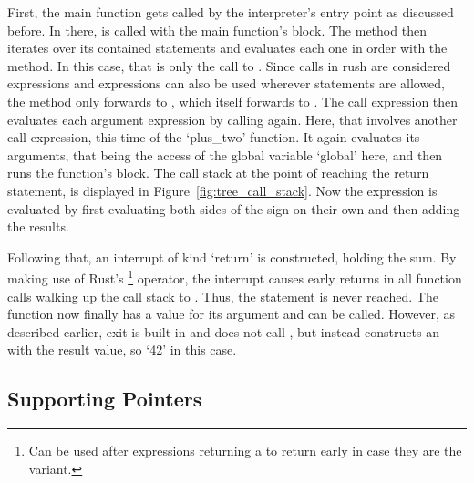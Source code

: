 First, the main function gets called by the interpreter's entry point as discussed before.
In there,  is called with the main function's block.
The  method then iterates over its contained statements and evaluates each one in order with the  method.
In this case, that is only the call to .
Since calls in rush are considered expressions and expressions can also be used wherever statements are allowed, the  method only forwards to , which itself forwards to .
The call expression then evaluates each argument expression by calling  again.
Here, that involves another call expression, this time of the `plus\_two' function.
It again evaluates its arguments, that being the access of the global variable `global' here, and then runs the function's block.
The call stack at the point of reaching the return statement, is displayed in Figure~\ref{fig:tree_call_stack}.
Now the expression  is evaluated by first evaluating both sides of the \qVerb{+} sign on their own and then adding the results.

Following that, an interrupt of kind `return' is constructed, holding the sum.
By making use of Rust's \footnote{Can be used after expressions returning a  to return early in case they are the  variant.} operator, the interrupt causes early returns in all function calls walking up the call stack to .
Thus, the statement  is never reached.
The  function now finally has a value for its argument and can be called.
However, as described earlier, exit is built-in and does not call , but instead constructs an  with the result value, so `42' in this case.

\subsection{Supporting Pointers}\label{sec:tree_pointers}

